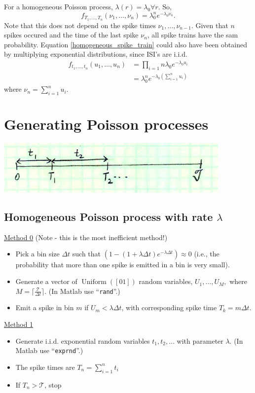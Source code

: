 \documentclass[11pt]{article}
\DeclareMathOperator{\Uniform}{Uniform}
\begin{document}
For a homogeneous Poisson process, $\lambda (r) = \lambda_0 \forall r$. So,
\begin{equation}
\label{homogeneous_spike_train}
f_{T_1,\ldots,T_n}(\nu_1,\ldots,\nu_n) = \lambda_0^n e^{-\lambda_0 \nu_n}.
\end{equation}
Note that this does not depend on the spike times $\nu_1, \ldots, \nu_{n-1}$. Given that $n$ spikes occured and the
time of the last spike $\nu_n$, all spike trains have the sam probability. Equation \ref{homogeneous_spike_train} could also
have been obtained by multiplying exponential distributions, since ISI's are i.i.d.
\begin{align*}
f_{t_1,\ldots,t_n}(u_1,\ldots,u_n) &= \prod_{i=1}{n} \lambda_0 e^{-\lambda_0 u_i} \\
 &= \lambda_0^n e^{-\lambda_0 \left(\sum_{i=1}^n u_i\right)}
\end{align*}
where $\nu_n = \sum_{i=1}^n u_i$.

\section{Generating Poisson processes}
\begin{center}
\includegraphics[scale=0.5]{Figure12.jpg}
\end{center}
\subsection{Homogeneous Poisson process with rate $\lambda$}
\underline{Method 0} (Note - this is the most inefficient method!)
\begin{itemize}
\item Pick a bin size $\Delta t$ such that $\left(1 - (1 + \lambda \Delta t) e^{-\lambda \Delta t}\right) \approx 0$ 
(i.e., the probability that more than one spike is emitted in a bin is very small).
\item Generate a vector of $\Uniform([0 1])$ random variables, $U_1, \ldots, U_M,$ where $M = \lceil \frac{\mathcal{T}}{\Delta t} \rceil$. 
(In  {\sc Matlab} use ``{\tt rand}''.)
\item Emit a spike in bin $m$ if $U_m < \lambda \Delta t$, with corresponding spike time $T_k = m \Delta t$.
\end{itemize}
\underline{Method 1}
\begin{itemize}
\item Generate i.i.d. exponential random variables $t_1, t_2, \ldots$ with parameter $\lambda$. (In {\sc Matlab} use
``{\tt exprnd}''.)
\item The spike times are $T_n = \sum_{i=1}^n t_i$
\item If $T_n > \mathcal{T}$, stop
\end{itemize}
\end{document}
